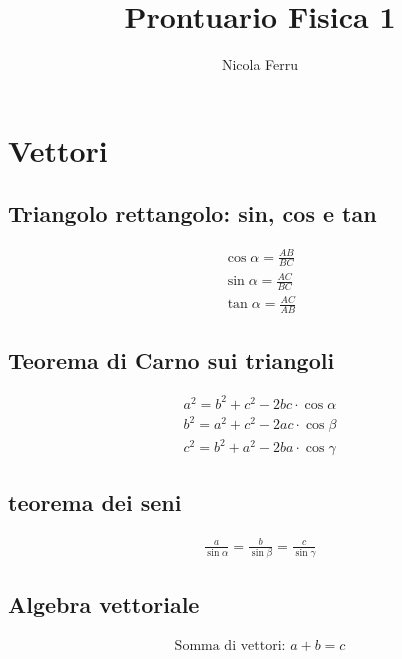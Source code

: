 \documentclass{article}
\title{Prontuario Fisica 1}
\author{Nicola Ferru}
\begin{document}
\maketitle

\section{Vettori}
\label{sec:vect}

\subsection{Triangolo rettangolo: sin, cos e tan}
\label{sec:triangoretsincosetan}
\begin{eqnarray}
  \label{eq:sincostan}
  \cos \alpha = \frac{AB}{BC}\\
  \sin \alpha = \frac{AC}{BC}\\
  \tan \alpha = \frac{AC}{AB}
\end{eqnarray}

\subsection{Teorema di Carno sui triangoli}
\label{sec:carnoetriang}

\begin{eqnarray}
  \label{eq:teoremadicarnot}
  a^2=b^2+c^2-2bc\cdot \cos\alpha\\
  b^2=a^2+c^2-2ac \cdot \cos \beta\\
  c^2=b^2+a^2-2ba\cdot \cos \gamma
\end{eqnarray}

\subsection{teorema dei seni}
\label{teorseni}

\begin{eqnarray}
  \label{eq:sin}
  \frac{a}{\sin \alpha} = \frac{b}{\sin \beta} = \frac{c}{\sin \gamma}
\end{eqnarray}

\subsection{Algebra vettoriale}
\label{sec:algvett}

\begin{eqnarray}
  \label{eq:algvet}
  \text{Somma di vettori: } a+b=c
\end{eqnarray}
\end{document}
